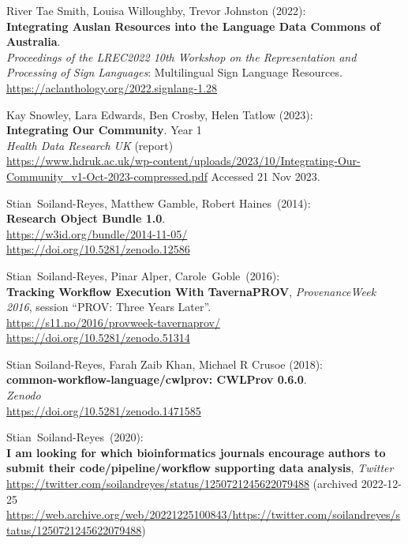 \begin{thebibliography}{9}
River Tae Smith, Louisa Willoughby, Trevor Johnston (2022):\\
\textbf{Integrating Auslan Resources into the Language Data Commons of Australia}.\\
\emph{Proceedings of the LREC2022 10th Workshop on the Representation and Processing of Sign Languages}: Multilingual Sign Language Resources.\\
\url{https://aclanthology.org/2022.signlang-1.28}

Kay Snowley, Lara Edwards, Ben Crosby, Helen Tatlow (2023):\\
\textbf{Integrating Our Community}. Year 1 \\
\emph{Health Data Research UK} (report) \\
\url{https://www.hdruk.ac.uk/wp-content/uploads/2023/10/Integrating-Our-Community_v1-Oct-2023-compressed.pdf}
Accessed 21 Nov 2023.

Stian~Soiland-Reyes, Matthew Gamble, Robert Haines~(2014):\\
\textbf{Research Object Bundle 1.0}.\\
\url{https://w3id.org/bundle/2014-11-05/}\\
\url{https://doi.org/10.5281/zenodo.12586}

Stian~Soiland-Reyes, Pinar Alper, Carole~Goble~(2016):\\
\textbf{Tracking Workflow Execution With TavernaPROV},
\emph{ProvenanceWeek 2016}, session ``PROV: Three Years Later''.\\
\url{https://s11.no/2016/provweek-tavernaprov/}\\
\url{https://doi.org/10.5281/zenodo.51314}

Stian Soiland-Reyes, Farah Zaib Khan, Michael R Crusoe (2018):\\
\textbf{common-workflow-language/cwlprov: CWLProv 0.6.0}.\\
\emph{Zenodo}\\
\url{https://doi.org/10.5281/zenodo.1471585}

Stian~Soiland-Reyes~(2020):\\
\textbf{I am looking for which bioinformatics journals encourage authors
to submit their code/pipeline/workflow supporting data analysis},
\emph{Twitter}\\
\url{https://twitter.com/soilandreyes/status/1250721245622079488}
(archived 2022-12-25 
\url{https://web.archive.org/web/20221225100843/https://twitter.com/soilandreyes/status/1250721245622079488})


\end{thebibliography}
